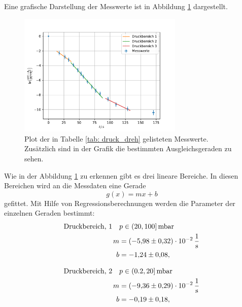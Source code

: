 Eine grafische Darstellung der Messwerte ist in Abbildung \ref{fig: druck_dreh} dargestellt.

\FloatBarrier
\begin{figure}[h]
  \centering
  \includegraphics[width=0.7\textwidth]{../Messdaten/plots/dreh/druckplot_drehschieber.pdf}
  \caption{Plot der in Tabelle \ref{tab: druck_dreh} gelisteten Messwerte. Zusätzlich sind in der Grafik die bestimmten Ausgleichsgeraden zu sehen.}
  \label{fig: druck_dreh}
\end{figure}
\FloatBarrier

Wie in der Abbildung \ref{fig: druck_dreh} zu erkennen gibt es drei lineare Bereiche.
In diesen Bereichen wird an die Messdaten eine Gerade
\begin{equation}
  \label{eq: geradengleichung}
  g(x)=mx+b
\end{equation}
gefittet. Mit Hilfe von Regressionsberechnungen werden die Parameter der einzelnen Geraden bestimmt:
\begin{align}
  \label{eq: regression_dreh_druck_1}
  \begin{aligned}
  \text{Druckbereich, 1} \quad  &p\in(20,100]\,\si{\milli\bar} \\
  m&=\SI{-5.98\pm0.32 e-2}{\per\second} \\
  b&=\num{-1.24 \pm0.08 },
\end{aligned}
\end{align}

\begin{align}
  \label{eq: regression_dreh_druck_2}
  \begin{aligned}
  \text{Druckbereich, 2} \quad  &p\in(0.2,20]\,\si{\milli\bar} \\
  m&=\SI{-9.36\pm0.29 e-2}{\per\second} \\
  b&=\num{-0.19 \pm0.18 },
\end{aligned}
\end{align}

